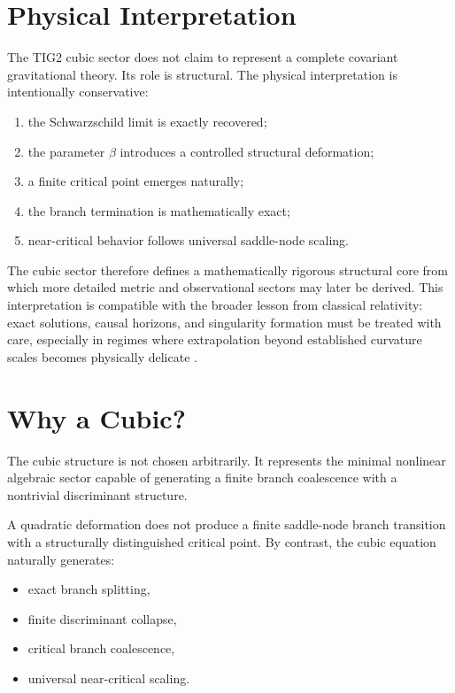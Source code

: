 \documentclass[12pt,a4paper]{article}
\begin{document}
\section{Physical Interpretation}

The TIG2 cubic sector does not claim to represent a complete covariant gravitational theory. Its role is structural. The physical interpretation is intentionally conservative:
\begin{enumerate}
\item the Schwarzschild limit is exactly recovered;
\item the parameter \(\beta\) introduces a controlled structural deformation;
\item a finite critical point emerges naturally;
\item the branch termination is mathematically exact;
\item near-critical behavior follows universal saddle-node scaling.
\end{enumerate}

The cubic sector therefore defines a mathematically rigorous structural core from which more detailed metric and observational sectors may later be derived. This interpretation is compatible with the broader lesson from classical relativity: exact solutions, causal horizons, and singularity formation must be treated with care, especially in regimes where extrapolation beyond established curvature scales becomes physically delicate \cite{hawkingellis1973,penrose1965,wald1984}.


\section{Why a Cubic?}

The cubic structure is not chosen arbitrarily. It represents the minimal nonlinear algebraic sector capable of generating a finite branch coalescence with a nontrivial discriminant structure.

A quadratic deformation does not produce a finite saddle-node branch transition with a structurally distinguished critical point. By contrast, the cubic equation naturally generates:
\begin{itemize}
\item exact branch splitting,
\item finite discriminant collapse,
\item critical branch coalescence,
\item universal near-critical scaling.
\end{itemize}
\end{document}
